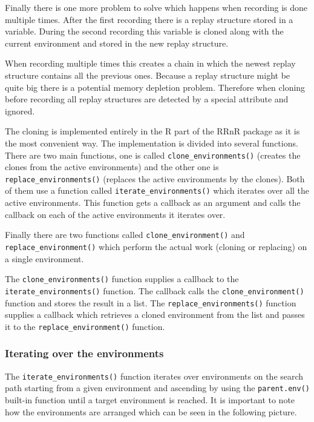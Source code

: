 \documentclass[thesis=M,english,hidelinks]{FITthesis}[2012/10/20]
\begin{document}
		Finally there is one more problem to solve which happens when recording is done multiple times. After the first recording there is a replay structure stored in a variable. During the second recording this variable is cloned along with the current environment and stored in the new replay structure.\par
		
		When recording multiple times this creates a chain in which the newest replay structure contains all the previous ones. Because a replay structure might be quite big there is a potential memory depletion problem. Therefore when cloning before recording all replay structures are detected by a special attribute and ignored.\par
		
		The cloning is implemented entirely in the R part of the RRnR package as it is the most convenient way. The implementation is divided into several functions. There are two main functions, one is called \lstinline|clone_environments()| (creates the clones from the active environments) and the other one is \lstinline|replace_|\allowbreak\lstinline|environments()| (replaces the active environments by the clones). Both of them use a function called \lstinline|iterate_environments()| which iterates over all the active environments. This function gets a callback as an argument and calls the callback on each of the active environments it iterates over.\par
		
		Finally there are two functions called \lstinline|clone_environment()| and \lstinline|replace_|\allowbreak\lstinline|environment()| which perform the actual work (cloning or replacing) on a single environment.\par
		
		The \lstinline|clone_environments()| function supplies a callback to the \lstinline|iterate_|\allowbreak\lstinline|environments()| function. The callback calls the \lstinline|clone_environment()| function and stores the result in a list. The \lstinline|replace_environments()| function supplies a callback which retrieves a cloned environment from the list and passes it to the \lstinline|replace_environment()| function.\par
		
			\subsubsection{Iterating over the environments}
			The \lstinline|iterate_environments()| function iterates over environments on the search path starting from a given environment and ascending by using the \lstinline|parent.env()| built-in function until a target environment is reached. It is important to note how the environments are arranged which can be seen in the following picture.\par
			
\end{document}
